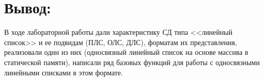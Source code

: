 \documentclass[12pt]{article}
\begin{document}
{	
	\section{Вывод:}
	
	В ходе лабораторной работы дали характеристику СД типа <<линейный список>> и ее подвидам (ПЛС, ОЛС, ДЛС), форматам их представления, реализовали один из них (односвязный линейный список на основе массива в статической памяти), написали ряд базовых функций для работы с односвязными линейными списками в этом формате.
	
}
\end{document}
